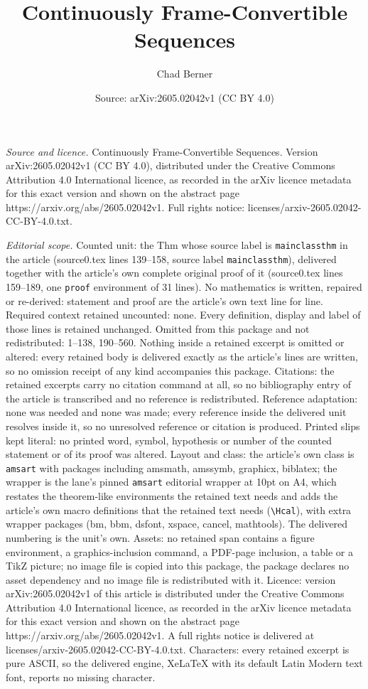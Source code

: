 \documentclass[10pt,a4paper]{amsart}
\title[Continuously Frame-Convertible Sequences]{Continuously Frame-Convertible Sequences}
\author{Chad Berner}
\date{Source: arXiv:2605.02042v1 (CC BY 4.0)}
\begin{document}
\maketitle

\noindent\emph{Source and licence.} Continuously Frame-Convertible Sequences. Version arXiv:2605.02042v1 (CC BY 4.0), distributed under the Creative Commons Attribution 4.0 International licence, as recorded in the arXiv licence metadata for this exact version and shown on the abstract page https://arxiv.org/abs/2605.02042v1. Full rights notice: licenses/arxiv-2605.02042-CC-BY-4.0.txt.\par\smallskip

\noindent\textit{Editorial scope.} Counted unit: the Thm whose source label is \texttt{mainclassthm} in the article (source0.tex lines 139--158, source label \texttt{mainclassthm}), delivered together with the article's own complete original proof of it (source0.tex lines 159--189, one \texttt{proof} environment of 31 lines). No mathematics is written, repaired or re-derived: statement and proof are the article's own text line for line. Required context retained uncounted: none. Every definition, display and label of those lines is retained unchanged. Omitted from this package and not redistributed: 1--138, 190--560. Nothing inside a retained excerpt is omitted or altered: every retained body is delivered exactly as the article's lines are written, so no omission receipt of any kind accompanies this package. Citations: the retained excerpts carry no citation command at all, so no bibliography entry of the article is transcribed and no reference is redistributed. Reference adaptation: none was needed and none was made; every reference inside the delivered unit resolves inside it, so no unresolved reference or citation is produced. Printed slips kept literal: no printed word, symbol, hypothesis or number of the counted statement or of its proof was altered. Layout and class: the article's own class is \texttt{amsart} with packages including amsmath, amssymb, graphicx, biblatex; the wrapper is the lane's pinned \texttt{amsart} editorial wrapper at 10pt on A4, which restates the theorem-like environments the retained text needs and adds the article's own macro definitions that the retained text needs (\texttt{\textbackslash Hcal}), with extra wrapper packages (bm, bbm, dsfont, xspace, cancel, mathtools). The delivered numbering is the unit's own. Assets: no retained span contains a figure environment, a graphics-inclusion command, a PDF-page inclusion, a table or a TikZ picture; no image file is copied into this package, the package declares no asset dependency and no image file is redistributed with it. Licence: version arXiv:2605.02042v1 of this article is distributed under the Creative Commons Attribution 4.0 International licence, as recorded in the arXiv licence metadata for this exact version and shown on the abstract page https://arxiv.org/abs/2605.02042v1. A full rights notice is delivered at licenses/arxiv-2605.02042-CC-BY-4.0.txt. Characters: every retained excerpt is pure ASCII, so the delivered engine, XeLaTeX with its default Latin Modern text font, reports no missing character.
\end{document}
